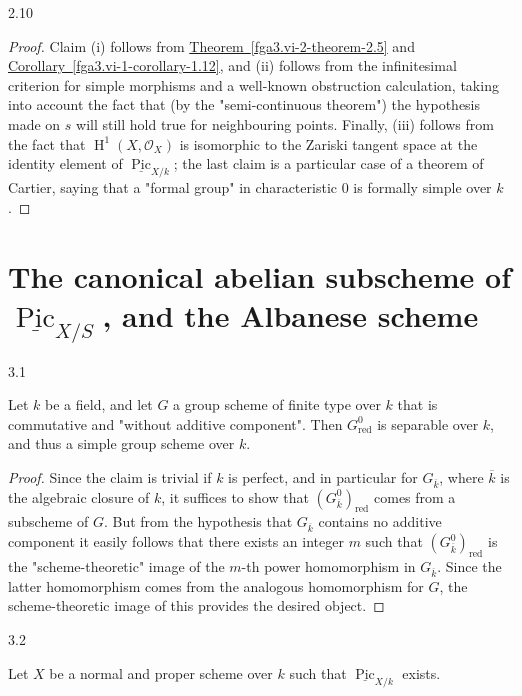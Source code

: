 \begin{proposition}{2.10}
\begin{enumerate}
  \end{enumerate}\begin{proof}\par{}Claim (i) follows from \hyperref[fga3.vi-2-theorem-2.5]{Theorem~\ref*{fga3.vi-2-theorem-2.5}} and \hyperref[fga3.vi-1-corollary-1.12]{Corollary~\ref*{fga3.vi-1-corollary-1.12}}, and (ii) follows from the infinitesimal criterion for simple morphisms and a well-known obstruction calculation, taking into account the fact that (by the "semi-continuous theorem") the hypothesis made on \(s\) will still hold true for neighbouring points.
      Finally, (iii) follows from the fact that \(\operatorname {H}^1(X,\mathcal {O}_X)\) is isomorphic to the Zariski tangent space at the identity element of \(\underline {\operatorname {Pic}}_{X/k}\);
      the last claim is a particular case of a theorem of Cartier, saying that a "formal group" in characteristic \(0\) is formally simple over \(k\).\end{proof}\end{proposition}\chapter{The canonical abelian subscheme of \(\underline {\operatorname {Pic}}_{X/S}\), and the Albanese scheme}\thispagestyle{fancy}\label{fga3.vi-3}\begin{proposition}{3.1}\label{fga3.vi-3-proposition-3.1}\skipsinglepar\par{}Let \(k\) be a field, and let \(G\) a group scheme of finite type over \(k\) that is commutative and "without additive component".
    Then \(G_\mathrm {red}^0\) is separable over \(k\), and thus a simple group scheme over \(k\).\begin{proof}\par{}Since the claim is trivial if \(k\) is perfect, and in particular for \(G_{\overline {k}}\), where \(\overline {k}\) is the algebraic closure of \(k\), it suffices to show that \((G_{\overline {k}}^0)_\mathrm {red}\) comes from a subscheme of \(G\).
      But from the hypothesis that \(G_{\overline {k}}\) contains no additive component it easily follows that there exists an integer \(m\) such that \((G_{\overline {k}}^0)_\mathrm {red}\) is the "scheme-theoretic" image of the \(m\)-th power homomorphism in \(G_{\overline {k}}\).
      Since the latter homomorphism comes from the analogous homomorphism for \(G\), the scheme-theoretic image of this provides the desired object.\end{proof}\end{proposition}\begin{corollary}{3.2}\label{fga3.vi-3-corollary-3.2}\skipsinglepar\par{}Let \(X\) be a normal and proper scheme over \(k\) such that \(\underline {\operatorname {Pic}}_{X/k}\) exists.

\end{corollary}
